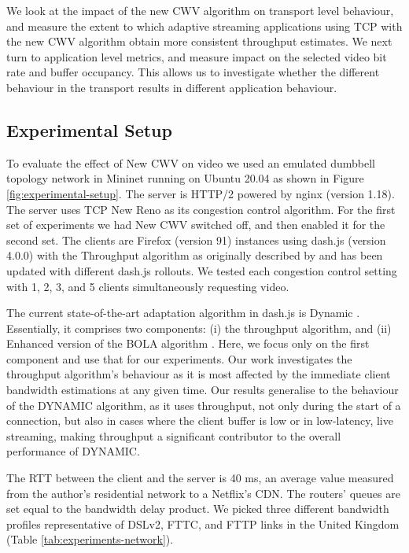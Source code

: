 \documentclass[10pt,sigconf]{acmart}
\begin{document}
We look at the impact of the new CWV algorithm on transport level behaviour, and measure the extent to which adaptive streaming applications using TCP with the new CWV algorithm obtain more consistent throughput estimates. We next turn to application level metrics, and measure impact on the selected video bit rate and buffer occupancy. This allows us to investigate whether the different behaviour in the transport results in different application behaviour. 

\subsection{Experimental Setup}
\label{sec:experimental-setup}

To evaluate the effect of New CWV on video we used an emulated dumbbell topology network in Mininet running on Ubuntu 20.04 as shown in Figure \ref{fig:experimental-setup}.
 The server is HTTP/2 powered by nginx (version 1.18). The server uses TCP New Reno as its congestion control algorithm. For the first set of experiments we had New CWV switched off, and then enabled it for the second set.
 The clients are Firefox (version 91) instances using dash.js (version 4.0.0) with the Throughput algorithm as originally described by \cite{Spiteri-2019-from-theory-to-practice-sabre} and has been updated with different dash.js rollouts. We tested each congestion control setting with 1, 2, 3, and 5 clients simultaneously requesting video.
 
The current state-of-the-art adaptation algorithm in dash.js is Dynamic \cite{Spiteri-2019-from-theory-to-practice-sabre}. Essentially, it comprises two components: (i) the throughput algorithm, and (ii) Enhanced version of the BOLA algorithm \cite{Spiteri-2016-BOLA}. Here, we focus only on the first component and use that for our experiments. Our work investigates the throughput algorithm's behaviour as it is most affected by the immediate client bandwidth estimations at any given time. Our results generalise to the behaviour of the DYNAMIC algorithm, as it uses throughput, not only during the start of a connection, but also in cases where the client buffer is low or in low-latency, live streaming, making throughput a significant contributor to the overall performance of DYNAMIC.

The RTT between the client and the server is 40 ms, an average value measured from the author's residential network to a Netflix's CDN. The routers' queues are set equal to the bandwidth delay product. We picked three different bandwidth profiles representative of DSLv2, FTTC, and FTTP links in the United Kingdom \cite{online-ofcom-report} (Table \ref{tab:experiments-network}).
\end{document}
